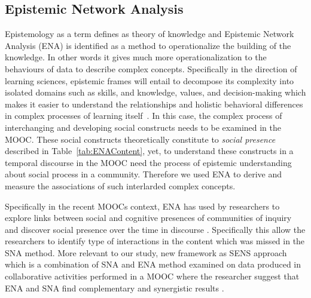 \documentclass[format=acmsmall, review=false, screen=true]{acmart}
\begin{document}
\subsection{Epistemic Network Analysis}
Epistemology as a term defines as theory of knowledge and Epistemic Network Analysis (ENA) is identified as a method to operationalize the building of the knowledge. In other words it gives much more operationalization to the behaviours of data to describe complex concepts. Specifically in the direction of learning sciences, epistemic frames will entail to decompose its complexity into isolated domains such as skills, and knowledge, values, and decision-making which makes it easier to understand the relationships and holistic behavioral differences in complex processes of learning itself~\cite{shaffer2017quantitative, shaffer2009epistemic, rupp2010evidence}. 
In this case, the complex process of interchanging and developing social constructs needs to be examined in the MOOC. These social constructs theoretically constitute to \textit{social presence} described in Table~\ref{tab:ENAContent}, yet, to understand these constructs in a temporal discourse in the MOOC need the process of epistemic understanding about social process in a community. Therefore we used ENA to derive and measure the associations of such interlarded complex concepts.

Specifically in the recent MOOCs context, ENA has used by researchers to explore links between social and cognitive presences of communities of inquiry and discover social presence over the time in discourse \cite{rolim2019network}. Specifically this allow the researchers to identify type of interactions in the content which was missed in the SNA method. More relevant to our study, new framework as SENS approach which is a combination of SNA and ENA method examined on data produced in collaborative activities performed in a MOOC where the researcher suggest that ENA and SNA find complementary and synergistic results \cite{gavsevic2019sens}. 
\end{document}
